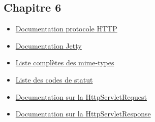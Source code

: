 \documentclass{article}[12pt]
\begin{document}
\subsection{Chapitre 6}
\begin{itemize}
	\item  \href{https://tools.ietf.org/html/rfc2616}{Documentation protocole HTTP}
    \item \href{http://www.eclipse.org/jetty/}{Documentation Jetty}
    \item \href{https://www.sitepoint.com/web-foundations/mime-types-complete-list/}{Liste complètes des mime-types}
    \item \href{https://www.w3.org/Protocols/rfc2616/rfc2616-sec10.html}{Liste des codes de statut}
    \item \href{http://docs.oracle.com/javaee/7/api/javax/servlet/http/HttpServletRequest.html}{Documentation sur la HttpServletRequest}
    \item \href{http://docs.oracle.com/javaee/7/api/javax/servlet/http/HttpServletResponse.html}{Documentation sur la HttpServletResponse}
\end{itemize}
\end{document}
